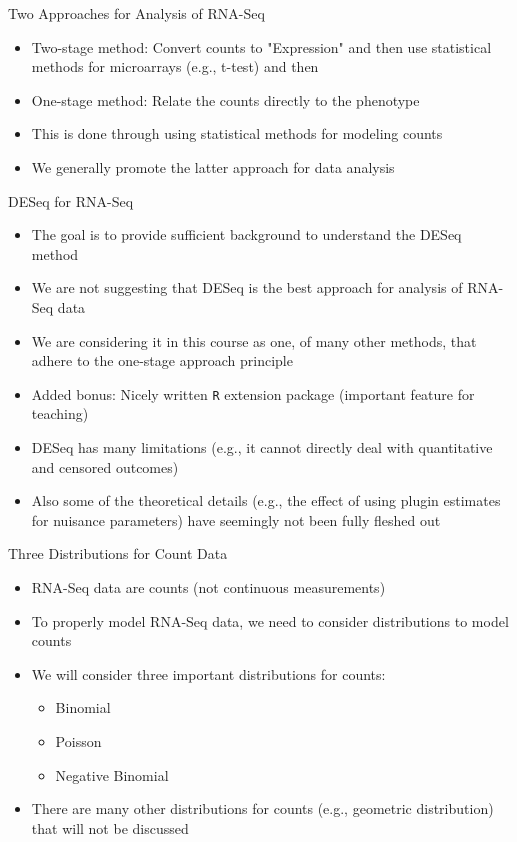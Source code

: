 \documentclass[xcolor=x11names,compress]{beamer}\usepackage[]{graphicx}\usepackage[]{color}
\begin{document}
\begin{frame}{Two Approaches for Analysis of RNA-Seq}
  \begin{itemize}
    \item Two-stage method: Convert counts to "Expression" and then
      use statistical methods for microarrays (e.g., t-test)
      and then
    \item One-stage method: Relate the counts directly to the phenotype
    \item This is done through using statistical methods for modeling counts
    \item We generally promote the latter approach for data analysis
    \end{itemize}
\end{frame}    
\begin{frame}{DESeq for RNA-Seq}
  \begin{itemize}    
    \item The goal is to provide sufficient background to 
          understand the DESeq method
  \item We are not suggesting that DESeq is the best approach for analysis 
    of RNA-Seq data
  \item We are considering it in this course as one, of many other methods, that adhere to the one-stage approach principle
  \item Added bonus: Nicely written {\tt R} extension package 
        (important feature for teaching)
  \item DESeq has many limitations (e.g., it cannot directly deal with quantitative and censored outcomes) 
  \item Also some of the theoretical details 
       (e.g., the effect of using plugin estimates for nuisance parameters)
       have seemingly not been fully fleshed out
  \end{itemize}
\end{frame}







\begin{frame}{Three Distributions for Count Data}
  \begin{itemize}
  \item RNA-Seq data are counts (not continuous measurements)
  \item To properly model RNA-Seq data, we need to consider distributions
        to model counts
  \item We will consider three important distributions for counts:
  \begin{itemize}
  \item Binomial
  \item Poisson
  \item Negative Binomial
  \end{itemize}
  \item There are many other distributions for counts (e.g., geometric distribution) that will not be discussed
   \end{itemize}
\end{frame}
\end{document}
